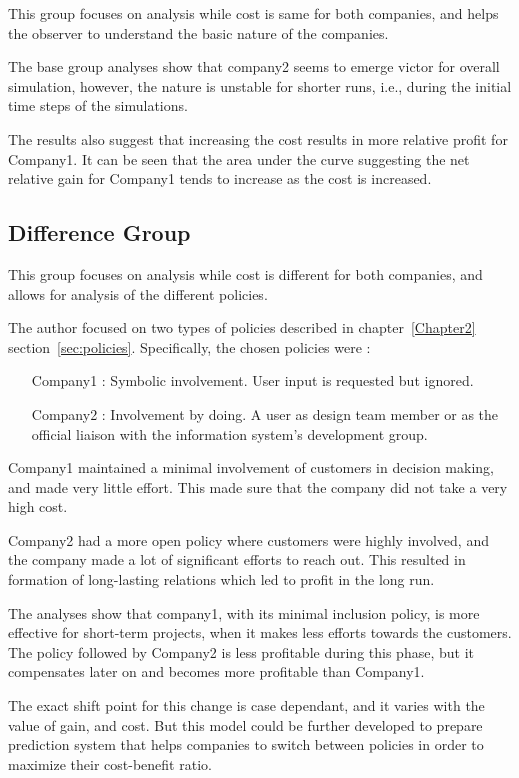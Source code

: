 This group focuses on analysis while cost is same for both companies, and helps the observer to understand the basic nature of the companies. 

The base group analyses show that company2 seems to emerge victor for overall simulation, however, the nature is unstable for shorter runs, i.e., during the initial time steps of the simulations.

The results also suggest that increasing the cost results in more relative profit for Company1. It can be seen that the area under the curve suggesting the net relative gain for Company1 tends to increase as the cost is increased. 



\subsection{Difference Group}

This group focuses on analysis while cost is different for both companies, and allows for analysis of the different policies.

The author focused on two types of policies described in chapter~\ref{Chapter2} section~\ref{sec:policies}. Specifically, the chosen policies were :

\begin{enumerate}
\item[Company1 :] Symbolic involvement. User input is requested but ignored.
\item[Company2 :] Involvement by doing. A user as design team member or as the official liaison with the information system’s development group.
\end{enumerate}


Company1 maintained a minimal involvement of customers in decision making, and made very little effort. This made sure that the company did not take a very high cost. 

Company2 had a more open policy where customers were highly involved, and the company made a lot of significant efforts to reach out. This resulted in formation of long-lasting relations which led to profit in the long run.

The analyses show that company1, with its minimal inclusion policy, is more effective for short-term projects, when it makes less efforts towards the customers. The policy followed by Company2 is less profitable during this phase, but it compensates later on and becomes more profitable than Company1.

The exact shift point for this change is case dependant, and it varies with the value of gain, and cost. But this model could be further developed to prepare prediction system that helps companies to switch between policies in order to maximize their cost-benefit ratio.
